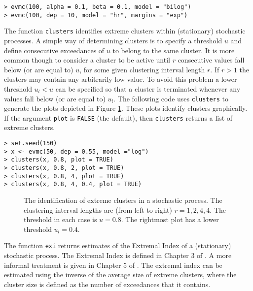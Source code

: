 \documentclass[11pt,a4paper]{article}
\begin{document}
\begin{verbatim}
> evmc(100, alpha = 0.1, beta = 0.1, model = "bilog")
> evmc(100, dep = 10, model = "hr", margins = "exp")
\end{verbatim}

The function \verb+clusters+ identifies extreme clusters within (stationary) stochastic processes. A simple way of determining clusters is to specify a threshold $u$ and define consecutive exceedances of $u$ to belong to the same cluster.
It is more common though to consider a cluster to be active until $r$ consecutive values fall below (or are equal to) $u$, for some given clustering interval length $r$.
If $r > 1$ the clusters may contain any arbitrarily low value.
To avoid this problem a lower threshold $u_l < u$ can be specified so that a cluster is terminated whenever any values fall below (or are equal to) $u_l$.
The following code uses \verb+clusters+ to generate the plots depicted in Figure \ref{clust}. 
These plots identify clusters graphically.
If the argument \verb+plot+ is \verb+FALSE+ (the default), then \verb+clusters+ returns a list of extreme clusters.        

\begin{verbatim}
> set.seed(150)
> x <- evmc(50, dep = 0.55, model ="log")
> clusters(x, 0.8, plot = TRUE)
> clusters(x, 0.8, 2, plot = TRUE)
> clusters(x, 0.8, 4, plot = TRUE)
> clusters(x, 0.8, 4, 0.4, plot = TRUE)
\end{verbatim}

\begin{figure}
\begin{center}
\vspace{-1.5cm}
\hspace{0cm}
\hspace{0cm} 
\hspace{0cm}
\end{center} 
\caption{The identification of extreme clusters in a stochastic process. The clustering interval lengths are (from left to right) $r = 1,2,4,4$. The threshold in each case is $u = 0.8$. The rightmost plot has a lower threshold $u_l = 0.4$.}
\label{clust}
\end{figure}

The function \verb+exi+ returns estimates of the Extremal Index of a (stationary) stochastic process. The Extremal Index is defined in Chapter 3 of \citet{leadling83}. A more informal treatment is given in Chapter 5 of \citet{cole01}. The extremal index can be estimated using the inverse of the average size of extreme clusters, where the cluster size is defined as the number of exceedances that it contains. 
\end{document}

